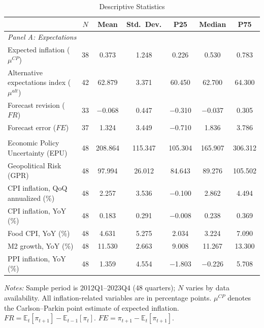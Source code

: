 \begin{table}[!htbp]
\centering
\small
\caption{Descriptive Statistics}
\label{tab:desc_stats}
\begin{threeparttable}

\begin{tabular}{lcccccc}
\toprule
 & $N$ & Mean & Std.\ Dev. & P25 & Median & P75 \\
\midrule
\multicolumn{7}{l}{\textit{Panel A: Expectations}} \\
\addlinespace
Expected inflation ($\mu^{CP}$) & 38 & 0.373 & 1.248 & 0.226 & 0.530 & 0.783 \\
Alternative expectations index ($\mu^{alt}$) & 42 & 62.879 & 3.371 & 60.450 & 62.700 & 64.300 \\
Forecast revision ($FR$) & 33 & $-$0.068 & 0.447 & $-$0.310 & $-$0.037 & 0.305 \\
Forecast error ($FE$) & 37 & 1.324 & 3.449 & $-$0.710 & 1.836 & 3.786 \\
\addlinespace
\multicolumn{7}{l}{\textit{Panel B: Macro Controls}} \\
\addlinespace
Economic Policy Uncertainty (EPU) & 48 & 208.864 & 115.347 & 105.304 & 165.907 & 306.312 \\
Geopolitical Risk (GPR) & 48 & 97.994 & 26.012 & 84.643 & 89.276 & 105.502 \\
CPI inflation, QoQ annualized (\%) & 48 & 2.257 & 3.536 & $-$0.100 & 2.862 & 4.494 \\
CPI inflation, YoY (\%) & 48 & 0.183 & 0.291 & $-$0.008 & 0.238 & 0.369 \\
Food CPI, YoY (\%) & 48 & 4.631 & 5.275 & 2.034 & 3.224 & 7.090 \\
M2 growth, YoY (\%) & 48 & 11.530 & 2.663 & 9.008 & 11.267 & 13.300 \\
PPI inflation, YoY (\%) & 48 & 1.359 & 4.554 & $-$1.803 & $-$0.226 & 5.708 \\
\bottomrule
\end{tabular}
\begin{tablenotes}[flushleft]
\footnotesize
\item \textit{Notes:} Sample period is 2012Q1--2023Q4 (48 quarters); $N$ varies by data availability. All inflation-related variables are in percentage points. $\mu^{CP}$ denotes the Carlson--Parkin point estimate of expected inflation. $FR = \mathbb{E}_t[\pi_{t+1}] - \mathbb{E}_{t-1}[\pi_t]$. $FE = \pi_{t+1} - \mathbb{E}_t[\pi_{t+1}]$.
\end{tablenotes}
\end{threeparttable}
\end{table}
